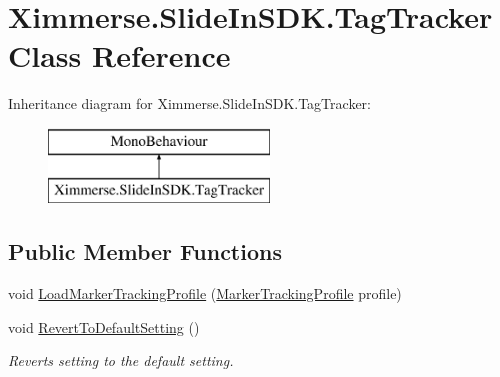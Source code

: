 \hypertarget{class_ximmerse_1_1_slide_in_s_d_k_1_1_tag_tracker}{}\section{Ximmerse.\+Slide\+In\+S\+D\+K.\+Tag\+Tracker Class Reference}
\label{class_ximmerse_1_1_slide_in_s_d_k_1_1_tag_tracker}
Inheritance diagram for Ximmerse.\+Slide\+In\+S\+D\+K.\+Tag\+Tracker\+:\begin{figure}[H]
\begin{center}
\leavevmode
\includegraphics[height=2.000000cm]{class_ximmerse_1_1_slide_in_s_d_k_1_1_tag_tracker}
\end{center}
\end{figure}
\subsection*{Public Member Functions}
\begin{DoxyCompactItemize}
\item 
void \mbox{\hyperlink{class_ximmerse_1_1_slide_in_s_d_k_1_1_tag_tracker_a80e7bd639c0ea90a79cb41a30b0604c5}{Load\+Marker\+Tracking\+Profile}} (\mbox{\hyperlink{class_ximmerse_1_1_slide_in_s_d_k_1_1_marker_tracking_profile}{Marker\+Tracking\+Profile}} profile)
\item 
void \mbox{\hyperlink{class_ximmerse_1_1_slide_in_s_d_k_1_1_tag_tracker_a46382491c251aac9de88006a2e7769a1}{Revert\+To\+Default\+Setting}} ()
\begin{DoxyCompactList}\small\item\em Reverts setting to the default setting. \end{DoxyCompactList}\end{DoxyCompactItemize}
